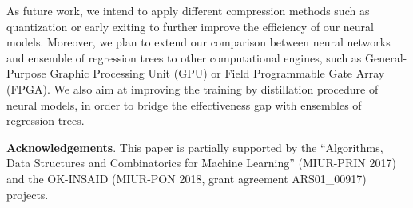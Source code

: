 As future work, we intend to apply different compression methods such as quantization or early exiting to further improve the efficiency of our neural models. Moreover, we plan to extend our comparison between neural networks and ensemble of regression trees to other computational engines, such as General-Purpose Graphic Processing Unit (GPU) or Field Programmable Gate Array (FPGA). We also aim at improving the training by distillation procedure of neural models, in order to bridge the effectiveness gap with ensembles of regression trees. 

\smallskip
\noindent \textbf{Acknowledgements}.
This paper is partially supported by the ``Algorithms, Data Structures and Combinatorics for Machine Learning'' (MIUR-PRIN 2017) and the OK-INSAID (MIUR-PON 2018, grant agreement ARS01\_00917) projects.










